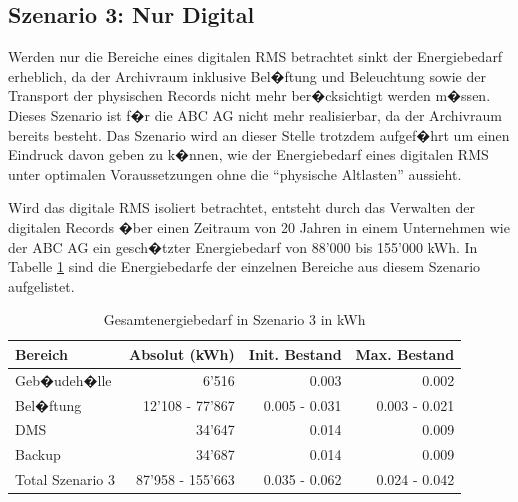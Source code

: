 \documentclass[a4paper,twoside,10pt]{report}
\begin{document}
\subsection{Szenario 3: Nur Digital}
Werden nur die Bereiche eines digitalen \ac{RMS} betrachtet sinkt der Energiebedarf erheblich, da der Archivraum inklusive Bel�ftung und Beleuchtung sowie der Transport der physischen Records nicht mehr ber�cksichtigt werden m�ssen. Dieses Szenario ist f�r die ABC AG nicht mehr realisierbar, da der Archivraum bereits besteht. Das Szenario wird an dieser Stelle trotzdem aufgef�hrt um einen Eindruck davon geben zu k�nnen, wie der Energiebedarf eines digitalen \ac{RMS} unter optimalen Voraussetzungen ohne die "`physische Altlasten"' aussieht.

Wird das digitale \ac{RMS} isoliert betrachtet, entsteht durch das Verwalten der digitalen Records �ber einen Zeitraum von 20 Jahren in einem Unternehmen wie der ABC AG ein gesch�tzter Energiebedarf von 88'000 bis 155'000 kWh. In Tabelle \ref{tab:ges_energ_szen3} sind die Energiebedarfe der einzelnen Bereiche aus diesem Szenario aufgelistet.

\begin{table} [h]
	\begin{tabular}{l|r|r|r}
	\hline
	\textbf{Bereich} & \textbf{Absolut (kWh)} & \textbf{Init. Bestand} & \textbf{Max. Bestand}\\
	\hline
	Geb�udeh�lle 	& 6'516 						& 0.003 				& 0.002\\
	Bel�ftung			&	12'108 - 77'867		& 0.005 - 0.031 & 0.003 - 0.021\\
	DMS				 		& 34'647 						& 0.014  				& 0.009\\
	Backup				& 34'687						& 0.014 				& 0.009 \\
	\hline
	\hline
	Total  Szenario 3 & 87'958 - 155'663  & 0.035 - 0.062 & 0.024 - 0.042 \\
	\hline
	\end{tabular}
\caption{Gesamtenergiebedarf in Szenario 3 in kWh} 
\label{tab:ges_energ_szen3}
\end{table}
\end{document}
